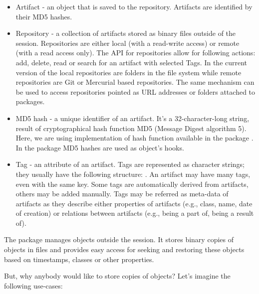 \documentclass[nojss]{jss}\usepackage[]{graphicx}\usepackage[]{color}
\begin{document}
\begin{itemize}
\item Artifact - an  object that is saved to the repository. Artifacts are identified by their MD5 hashes.
\item Repository - a collection of artifacts stored as binary files outside of the  session. Repositories are either local (with a read-write access) or {remote} (with a read access only). The API for repositories allow for following actions: add, delete, read or search for an artifact with selected Tags. In the current version of the  local repositories are folders in the file system while remote repositories are Git or Mercurial based repositories. The same mechanism can be used to access repositories pointed as URL addresses or folders attached to  packages.
\item MD5 hash - a unique identifier of an artifact. It's a 32-character-long string, result of cryptographical hash function MD5 (Message Digest algorithm 5). Here, we are using implementation of hash function available in the   package \citep[see]{digest}. In the  package MD5 hashes are used as object's hooks. 
\item Tag  - an attribute of an artifact. Tags are represented as character strings; they usually have the following structure: . An artifact may have many tags, even with the same key. Some tags are automatically derived from artifacts, others may be added manually. Tags may be referred as meta-data of artifacts as they describe either properties of artifacts (e.g., class, name, date of creation) or relations between artifacts (e.g., being a part of, being a result of).
\end{itemize}

The  package manages  objects outside the  session. It stores binary copies of  objects in  files and provides easy access for seeking and restoring these objects based on timestamps, classes or other properties.

But, why anybody would like to store copies of  objects? Let's imagine the following use-cases:
\end{document}
